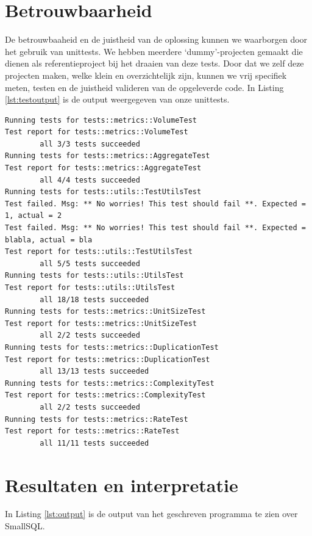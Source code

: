 \documentclass[a4paper]{article}
\begin{document}
\section{Betrouwbaarheid}
De betrouwbaaheid en de juistheid van de oplossing kunnen we waarborgen door het gebruik van unittests. 
We hebben meerdere `dummy'-projecten gemaakt die dienen als referentieproject bij het draaien van deze tests. 
Door dat we zelf deze projecten maken, welke klein en overzichtelijk zijn, kunnen we vrij specifiek meten, testen en de juistheid valideren van de opgeleverde code. In Listing \ref{lst:testoutput} is de output weergegeven van onze unittests.
\begin{lstlisting}[caption={Unit test output},label={lst:testoutput},frame = single]
Running tests for tests::metrics::VolumeTest
Test report for tests::metrics::VolumeTest                                                
        all 3/3 tests succeeded
Running tests for tests::metrics::AggregateTest
Test report for tests::metrics::AggregateTest                                             
        all 4/4 tests succeeded
Running tests for tests::utils::TestUtilsTest
Test failed. Msg: ** No worries! This test should fail **. Expected = 1, actual = 2       
Test failed. Msg: ** No worries! This test should fail **. Expected = blabla, actual = bla
Test report for tests::utils::TestUtilsTest                                 
        all 5/5 tests succeeded
Running tests for tests::utils::UtilsTest
Test report for tests::utils::UtilsTest                                                     
        all 18/18 tests succeeded
Running tests for tests::metrics::UnitSizeTest
Test report for tests::metrics::UnitSizeTest                                              
        all 2/2 tests succeeded
Running tests for tests::metrics::DuplicationTest
Test report for tests::metrics::DuplicationTest                                             
        all 13/13 tests succeeded
Running tests for tests::metrics::ComplexityTest
Test report for tests::metrics::ComplexityTest                                            
        all 2/2 tests succeeded
Running tests for tests::metrics::RateTest
Test report for tests::metrics::RateTest                                                    
        all 11/11 tests succeeded
\end{lstlisting}
\section{Resultaten en interpretatie}
In Listing \ref{lst:output} is de output van het geschreven programma te zien over SmallSQL. 
\end{document}
